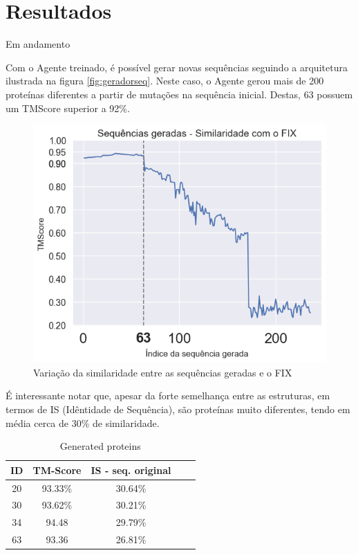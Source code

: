 \chapter{Resultados}

{\color{red} Em andamento}

Com o Agente treinado, é possível gerar novas sequências seguindo a arquitetura ilustrada na figura \ref{fig:geradorseq}.
Neste caso, o Agente gerou mais de 200 proteínas diferentes a partir de mutações na sequência inicial. Destas, 63 possuem um TMScore superior a 92\%.

\begin{figure}[H]
    \centering
    \includegraphics[width=.8\linewidth]{figuras/plot_tmscore_decreasing.png}    
    \caption{Variação da similaridade entre as sequências geradas e o FIX }
    \label{fig:rew_per_ep_train}
  \end{figure}

É interessante notar que, apesar da forte semelhança entre as estruturas, em termos de IS (Idêntidade de Sequência), são proteínas muito diferentes, tendo em média cerca de 30\% de similaridade. 
  
\begin{table}[htbp]
    \centering
    \begin{tabular}{c|cccc}
        \hline
        \textbf{ID} & \textbf{TM-Score} & \textbf{IS - seq. original} \\
        \hline
         20 & 93.33\% & 30.64\% \\
         30 & 93.62\% & 30.21\% \\
         34 & 94.48 & 29.79\% \\
         63 & 93.36 & 26.81\% \\
        \hline
    \end{tabular}
    \caption{Generated proteins}
    \label{tab:tabela_exemplo}
\end{table}

